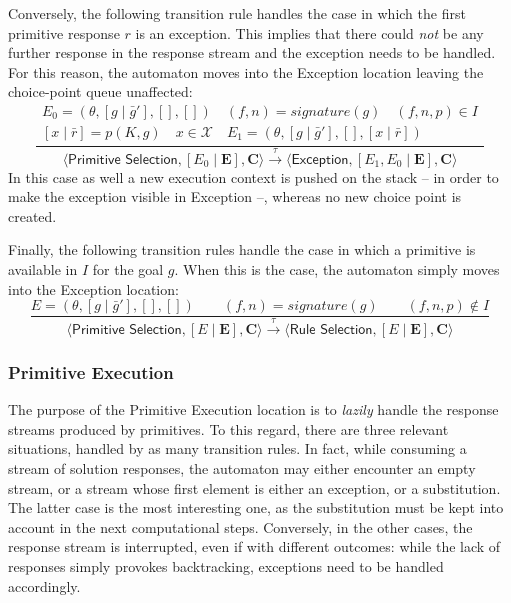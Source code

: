 \documentclass{article}
\newcommand{\stateStyle}[1]{\textsf{#1}}
\newcommand{\state}[1]{\stateStyle{#1}}
\newcommand{\stream}[1]{\bar{#1}}
\newcommand{\vect}[1]{\mathbf{#1}}
\newcommand{\notableset}[1]{\mathcal{#1}}
\newcommand{\f}[1]{\mathit{#1}}
\newcommand{\fx}[2]{\f{#1}(#2)}
\newcommand{\transition}[1]{\xrightarrow{\ #1\ }}
\begin{document}
Conversely, the following transition rule handles the case in which the first primitive response $r$ is an exception.
%
This implies that there could \emph{not} be any further response in the response stream and the exception needs to be handled.
%
For this reason, the automaton moves into the \state{Exception} location leaving the choice-point queue unaffected:
%
\[
    \frac{
        \begin{array}{c}
            E_0 = (\theta, [g \mid \stream{g}'], [], [])
            \quad
            (f, n) = \fx{signature}{g}
            \quad
            (f, n, p) \in I
            \\
            \left[x \mid \stream{r}\right] = p(K, g)
            \quad
            x \in \notableset{X}
            \quad
            E_1 = (\theta, [g \mid \stream{g}'], [], [x \mid \stream{r}])
        \end{array}
    }{
        \langle \state{Primitive Selection}, [E_0 \mid \vect{E}], \vect{C} \rangle
        \transition{\tau}
        \langle \state{Exception}, [E_1, E_0 \mid \vect{E}], \vect{C} \rangle
    }
\]
%
In this case as well a new execution context is pushed on the stack -- in order to make the exception visible in \state{Exception} --, whereas no new choice point is created.

Finally, the following transition rules handle the case in which a primitive is available in $I$ for the goal $g$.
%
When this is the case, the automaton simply moves into the \state{Exception} location:
%
\[
    \frac{
        E = (\theta, [g \mid \stream{g}'], [], [])
        \qquad
        (f, n) = \fx{signature}{g}
        \qquad
        (f, n, p) \not\in I
    }{
        \langle \state{Primitive Selection}, [E \mid \vect{E}], \vect{C} \rangle
        \transition{\tau}
        \langle \state{Rule Selection}, [E \mid \vect{E}], \vect{C} \rangle
    }
\]

\subsubsection{Primitive Execution}

The purpose of the \state{Primitive Execution} location is to \emph{lazily} handle the response streams produced by primitives.
%
To this regard, there are three relevant situations, handled by as many transition rules.
%
In fact, while consuming a stream of solution responses, the automaton may either encounter an empty stream, or a stream whose first element is either an exception, or a substitution.
%
The latter case is the most interesting one, as the substitution must be kept into account in the next computational steps.
%
Conversely, in the other cases, the response stream is interrupted, even if with different outcomes: while the lack of responses simply provokes backtracking, exceptions need to be handled accordingly.
\end{document}
